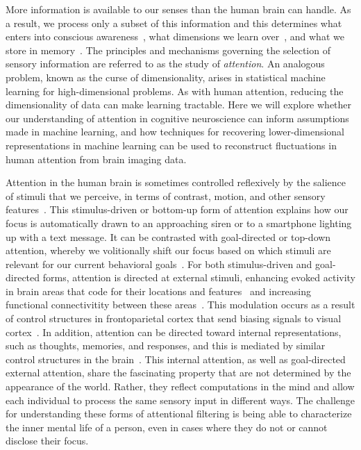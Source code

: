 
\label{sec:aim3}

More information is available to our senses than the human brain can
handle. As a result, we process only a subset of this information and
this determines what enters into conscious
awareness~\citep{Most:2005}, what dimensions we learn
over~\citep{Turk-Browne:2005}, and what we store in
memory~\citep{Aly:2016}. The principles and mechanisms governing the
selection of sensory information are referred to as the study of
\textit{attention}. An analogous problem, known as the curse of
dimensionality, arises in statistical machine learning for
high-dimensional problems. As with human attention, reducing the
dimensionality of data can make learning tractable. Here we will
explore whether our understanding of attention in cognitive
neuroscience can inform assumptions made in machine learning, and how
techniques for recovering lower-dimensional representations in machine
learning can be used to reconstruct fluctuations in human attention
from brain imaging data.

\biobackground{} Attention in the human brain is sometimes controlled
reflexively by the salience of stimuli that we perceive, in terms of
contrast, motion, and other sensory features~\citep{Itti:2000}. This
stimulus-driven or bottom-up form of attention explains how our focus
is automatically drawn to an approaching siren or to a smartphone
lighting up with a text message. It can be contrasted with
goal-directed or top-down attention, whereby we volitionally shift our
focus based on which stimuli are relevant for our current behavioral
goals~\citep{Yantis:2000}. For both stimulus-driven and goal-directed forms, attention is directed at external stimuli, enhancing evoked activity in brain areas that code for their locations and features~\citep{Kastner:2000} and increasing functional connectivitity between these areas~\citep{Turk-Browne:2013}. This modulation occurs as a result of control structures in frontoparietal cortex that send biasing signals to visual cortex~\citep{Noudoost:2010}. In addition, attention can be directed toward internal representations, such as thoughts, memories, and responses, and this is mediated by similar control structures in the brain~\citep{Chun:2011}. This internal attention, as well as goal-directed external attention, share the fascinating property that are not determined by the appearance of the world. Rather, they reflect computations in the mind and allow each individual to process the same sensory input in different ways. The challenge for understanding these forms of attentional filtering is being able to characterize the inner mental life of a person, even in cases where they do not or cannot disclose their focus.

